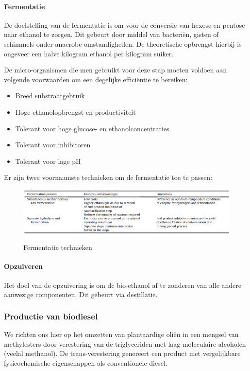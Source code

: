 \documentclass[a4paper,kul]{kulakarticle} %
\begin{document}
\paragraph{Fermentatie}
De doelstelling van de fermentatie is om voor de conversie van hexose en pentose naar ethanol te zorgen. Dit gebeurt door middel van bacteriën, gisten of schimmels onder anaerobe omstandigheden. De theoretische opbrengst hierbij is ongeveer een halve kilogram ethanol per kilogram suiker.

De micro-organismen die men gebruikt voor deze stap moeten voldoen aan volgende voorwaarden om een degelijke efficiëntie te bereiken:
\begin{itemize}
	\item Breed substraatgebruik
	\item Hoge ethanolopbrengst en productiviteit
	\item Tolerant voor hoge glucose- en ethanolconcentraties
	\item Tolerant voor inhibitoren
	\item Tolerant voor lage pH
\end{itemize}
Er zijn twee voornaamste technieken om de fermentatie toe te passen:
\begin{figure}[h]
	\centering
	\includegraphics[width=0.7\linewidth]{FermentatieTechniek}
	\caption[Fermentatie technieken]{Fermentatie technieken}
	\label{fig:fermentatietechniek}
\end{figure}

\paragraph{Opzuiveren}
Het doel van de opzuivering is om de bio-ethanol af te zonderen van alle andere aanwezige componenten. Dit gebeurt via destillatie. 
\subsubsection{Productie van biodiesel}
We richten ons hier op het omzetten van plantaardige oliën in een mengsel van methylesters door verestering van de triglyceriden met laag-moleculaire alcoholen (veelal methanol). De trans-verestering genereert een product met vergelijkbare fysicochemische eigenschappen als conventionele diesel. 
\end{document}
